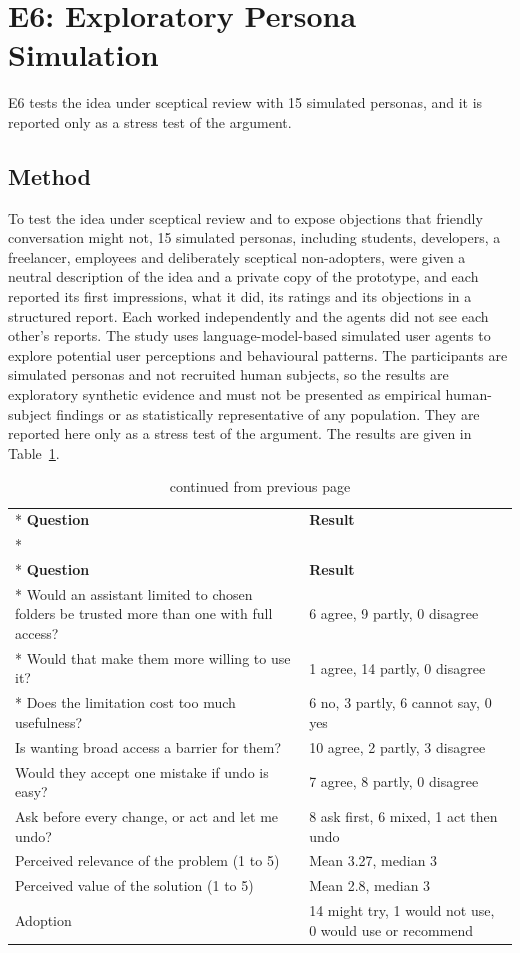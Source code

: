 \documentclass{FastFyp}
\begin{document}
\section{E6: Exploratory Persona Simulation}
E6 tests the idea under sceptical review with 15 simulated personas, and it is reported only as a stress test of the argument.

\subsection{Method}
To test the idea under sceptical review and to expose objections that friendly conversation might not, 15 simulated personas, including students, developers, a freelancer, employees and deliberately sceptical non-adopters, were given a neutral description of the idea and a private copy of the prototype, and each reported its first impressions, what it did, its ratings and its objections in a structured report. Each worked independently and the agents did not see each other's reports. The study uses language-model-based simulated user agents to explore potential user perceptions and behavioural patterns. The participants are simulated personas and not recruited human subjects, so the results are exploratory synthetic evidence and must not be presented as empirical human-subject findings or as statistically representative of any population. They are reported here only as a stress test of the argument. The results are given in Table~\ref{tab:sim}.


{
\begin{longtable}{|p{8.0cm}|p{5.2cm}|}
\caption{Persona simulation results.}\label{tab:sim}\\*
\hline
\textbf{Question} & \textbf{Result} \\*
\hline
\endfirsthead
\caption[]{continued from previous page}\\*
\hline
\textbf{Question} & \textbf{Result} \\*
\hline
\endhead
\hline
Would an assistant limited to chosen folders be trusted more than one with full access? & 6 agree, 9 partly, 0 disagree \\*
\hline
Would that make them more willing to use it? & 1 agree, 14 partly, 0 disagree \\*
\hline
Does the limitation cost too much usefulness? & 6 no, 3 partly, 6 cannot say, 0 yes \\
\hline
Is wanting broad access a barrier for them? & 10 agree, 2 partly, 3 disagree \\
\hline
Would they accept one mistake if undo is easy? & 7 agree, 8 partly, 0 disagree \\
\hline
Ask before every change, or act and let me undo? & 8 ask first, 6 mixed, 1 act then undo \\
\hline
Perceived relevance of the problem (1 to 5) & Mean 3.27, median 3 \\
\hline
Perceived value of the solution (1 to 5) & Mean 2.8, median 3 \\
\hline
Adoption & 14 might try, 1 would not use, 0 would use or recommend \\
\hline
\end{longtable}
}
\end{document}
